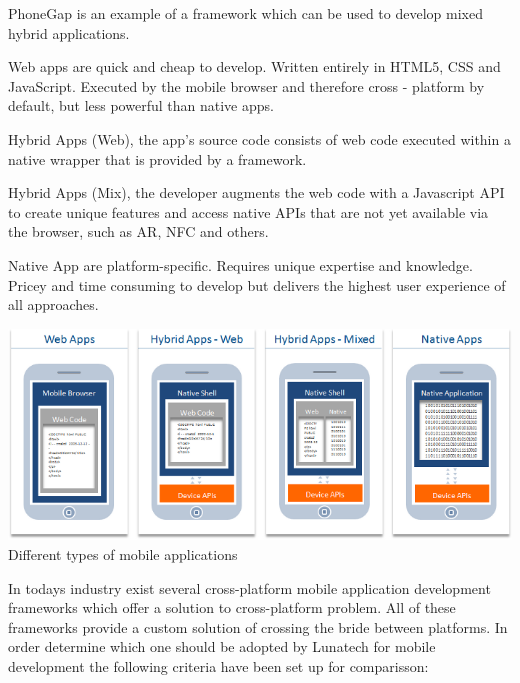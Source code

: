 PhoneGap is an example of a framework which can be used to develop mixed hybrid applications.

Web apps are quick and cheap to develop. Written entirely in HTML5, CSS and JavaScript. Executed by the mobile
browser and therefore cross - platform by default, but less powerful than native apps.
 
Hybrid Apps (Web), the app's source code consists of web code executed within a native wrapper that is provided by a framework.
 
Hybrid Apps (Mix), the developer augments the web code with a Javascript API to create unique features and
access native APIs that are not yet available via the browser, such as AR, NFC and others.
 
Native App are platform-specific. Requires unique expertise and knowledge. Pricey and time consuming to develop but
 delivers the highest user experience of all approaches.

\begin{centering}
\includegraphics[scale=0.5]{images/apptypesdefined.png}\\{Different types of mobile applications\cite{IBM-Worklight2012}}\\
\end{centering}

In todays industry exist several cross-platform mobile application development frameworks which offer a solution to cross-platform problem. All of these frameworks provide a custom solution of crossing the bride between platforms. In order determine which one should be adopted by Lunatech for mobile development the following criteria have been set up for comparisson:

